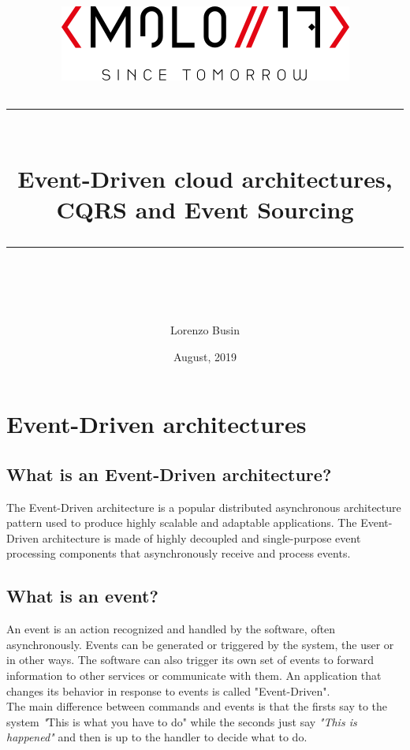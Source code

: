 \documentclass[11pt]{article} %
\title{	
	\normalfont\normalsize
	\includegraphics[width=0.5\columnwidth]{logo-black}
	\vspace{25pt} %
	\rule{\linewidth}{0.5pt}\\ %
	\vspace{20pt} %
	{\huge Event-Driven cloud architectures, CQRS and Event Sourcing}\\ %
	\vspace{12pt} %
	\rule{\linewidth}{2pt}\\ %
	\vspace{12pt} %
}
\author{\LARGE Lorenzo Busin} %
\date{\normalsize August, 2019} %
\begin{document}
\maketitle %



\section{Event-Driven architectures}  

\subsection{What is an Event-Driven architecture?}
The Event-Driven architecture is a popular distributed asynchronous architecture pattern used to produce highly scalable and adaptable applications. The Event-Driven architecture is made of highly decoupled and single-purpose event processing components that asynchronously receive and process events. 

\subsection{What is an event?}
An event is an action recognized and handled by the software, often asynchronously. Events can be generated or triggered by the system, the user or in other ways. The software can also trigger its own set of events to forward information to other services or communicate with them. An application that changes its behavior in response to events is called "Event-Driven".\\
The main difference between commands and events is that the firsts say to the system \emph"This is what you have to do" while the seconds just say \emph{"This is happened"} and then is up to the handler to decide what to do.
\end{document}
